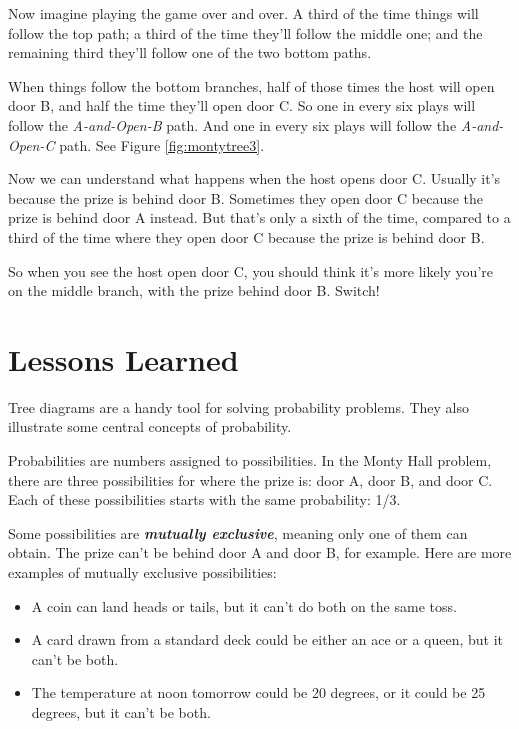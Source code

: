 \documentclass[justified]{tufte-book}
\providecommand{\tightlist}{%
  \setlength{\itemsep}{0pt}\setlength{\parskip}{0pt}}
\begin{document}
Now imagine playing the game over and over. A third of the time things will follow the top path; a third of the time they'll follow the middle one; and the remaining third they'll follow one of the two bottom paths.

When things follow the bottom branches, half of those times the host will open door B, and half the time they'll open door C. So one in every six plays will follow the \emph{A-and-Open-B} path. And one in every six plays will follow the \emph{A-and-Open-C} path. See Figure \ref{fig:montytree3}.

Now we can understand what happens when the host opens door C. Usually it's because the prize is behind door B. Sometimes they open door C because the prize is behind door A instead. But that's only a sixth of the time, compared to a third of the time where they open door C because the prize is behind door B.

So when you see the host open door C, you should think it's more likely you're on the middle branch, with the prize behind door B. Switch!

\hypertarget{lessons}{%
\section{Lessons Learned}\label{lessons}}

Tree diagrams are a handy tool for solving probability problems. They also illustrate some central concepts of probability.

Probabilities are numbers assigned to possibilities. In the Monty Hall problem, there are three possibilities for where the prize is: door A, door B, and door C. Each of these possibilities starts with the same probability: 1/3.

Some possibilities are \textbf{\emph{mutually exclusive}}, meaning only one of them can obtain. The prize can't be behind door A and door B, for example. Here are more examples of mutually exclusive possibilities:

\begin{itemize}
\tightlist
\item
  A coin can land heads or tails, but it can't do both on the same toss.
\item
  A card drawn from a standard deck could be either an ace or a queen, but it can't be both.
\item
  The temperature at noon tomorrow could be 20 degrees, or it could be 25 degrees, but it can't be both.
\end{itemize}
\end{document}
